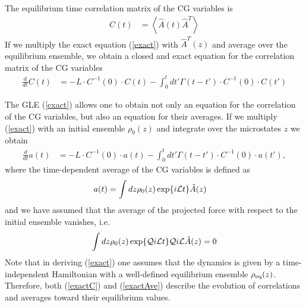 \documentclass[b5paper,openright,10pt]{book}
\newcommand{\esc}{\!\cdot\!}
\newcommand{\llangle}{\left\langle}
\newcommand{\rrangle}{\right\rangle}
\begin{document}
The equilibrium time  correlation matrix of the CG variables is 
\begin{align}
  C(t)&=  \llangle \hat{A}(t)\hat{A}^T\rrangle
\end{align}
If we  multiply the  exact equation (\ref{exact})  with $\hat{A}^T(z)$
and  average over  the equilibrium  ensemble, we  obtain a  closed and
exact equation for the correlation matrix of the CG variables
\begin{align}
  \frac{d}{dt}C(t)&=-L\esc C^{-1}(0)\esc C(t)
-\int_0^tdt' \Gamma(t-t')\esc C^{-1}(0)\esc  C(t')
\label{exactC}
\end{align}

The GLE (\ref{exact}) allows  one to obtain
not only an equation for the correlation of the CG variables, but also
an equation for  their averages. If we multiply  (\ref{exact}) with an
initial ensemble $\rho_0(z)$ and integrate over the microstates $z$ we
obtain
\begin{align}
  \frac{d}{dt}a(t) &= -L\esc C^{-1}(0)\esc a(t)
-\int_0^tdt' \Gamma(t-t')\esc  C^{-1}(0)\esc a(t'),
\label{exactAve}
\end{align}
where the time-dependent average of the CG variables is defined as
\begin{align}
  a(t)&=\int dz \rho_0(z) \exp\{i{\cal L}t\}\hat{A}(z)
\end{align}
and we have assumed that the average of the projected force with respect
to the initial ensemble vanishes, i.e.
\begin{align}
\int dz\rho_0(z)\exp\{{\cal Q}i{\cal L}t\} {\cal Q}i{\cal L}\hat{A}(z)=0
\label{F0}
\end{align}
 Note that in deriving (\ref{exact})
one  assumes  that  the  dynamics   is  given  by  a  time-independent
Hamiltonian  with  a   well-defined  equilibrium  ensemble  $\rho_{\rm
  eq}(z)$.   Therefore,   both  (\ref{exactC})   and  (\ref{exactAve})
describe  the evolution  of  correlations and  averages toward  their
equilibrium values.
\end{document}
